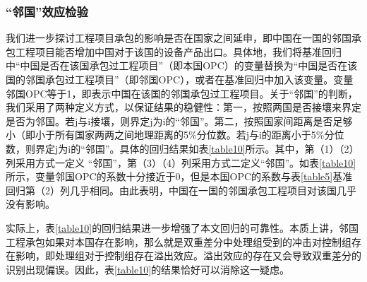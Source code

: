 \documentclass[a4paper,12pt]{article}
\begin{document}
\subsubsection{“邻国”效应检验}
我们进一步探讨工程项目承包的影响是否在国家之间延申，即中国在一国的邻国承包工程项目能否增加中国对于该国的设备产品出口。具体地，我们将基准回归中“中国是否在该国承包过工程项目”（即本国OPC）的变量替换为“中国是否在该国的邻国承包过工程项目”（即邻国OPC），或者在基准回归中加入该变量。变量邻国OPC等于1，即表示中国在该国的邻国承包过工程项目。关于“邻国”的判断，我们采用了两种定义方式，以保证结果的稳健性：第一，按照两国是否接壤来界定是否为邻国。若j与i接壤，则界定j为i的“邻国”。第二，按照国家间距离是否足够小（即小于所有国家两两之间地理距离的5\%分位数。若j与i的距离小于5\%分位数，则界定j为i的“邻国”。具体的回归结果如表\ref{table10}所示。其中，第（1）（2）列采用方式一定义 “邻国”，第（3）（4）列采用方式二定义“邻国”。如表\ref{table10}所示，变量邻国OPC的系数十分接近于0，但是本国OPC的系数与表\ref{table5}基准回归第（2）列几乎相同。由此表明，中国在一国的邻国承包工程项目对该国几乎没有影响。

\vspace{0.5em}  %

实际上，表\ref{table10}的回归结果进一步增强了本文回归的可靠性。本质上讲，邻国工程承包如果对本国存在影响，那么就是双重差分中处理组受到的冲击对控制组存在影响，即处理组对于控制组存在溢出效应。溢出效应的存在又会导致双重差分的识别出现偏误。因此，表\ref{table10}的结果恰好可以消除这一疑虑。
\end{document}
